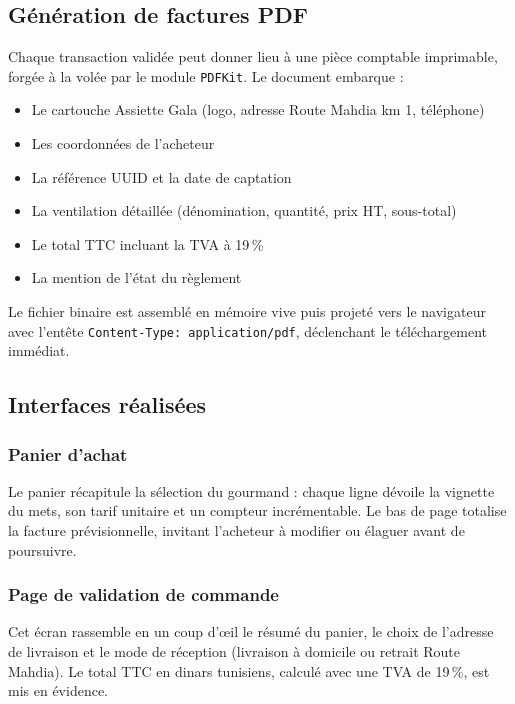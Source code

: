 \subsection{Génération de factures PDF}

Chaque transaction validée peut donner lieu à une pièce comptable imprimable, forgée à la volée par le module \texttt{PDFKit}. Le document embarque :

\begin{itemize}
    \item Le cartouche Assiette Gala (logo, adresse Route Mahdia km 1, téléphone)
    \item Les coordonnées de l'acheteur
    \item La référence UUID et la date de captation
    \item La ventilation détaillée (dénomination, quantité, prix HT, sous-total)
    \item Le total TTC incluant la TVA à 19\,\%
    \item La mention de l'état du règlement
\end{itemize}

Le fichier binaire est assemblé en mémoire vive puis projeté vers le navigateur avec l'entête \texttt{Content-Type: application/pdf}, déclenchant le téléchargement immédiat.

\subsection{Interfaces réalisées}

\subsubsection{Panier d'achat}


Le panier récapitule la sélection du gourmand : chaque ligne dévoile la vignette du mets, son tarif unitaire et un compteur incrémentable. Le bas de page totalise la facture prévisionnelle, invitant l'acheteur à modifier ou élaguer avant de poursuivre.

\subsubsection{Page de validation de commande}


Cet écran rassemble en un coup d'\oe{}il le résumé du panier, le choix de l'adresse de livraison et le mode de réception (livraison à domicile ou retrait Route Mahdia). Le total TTC en dinars tunisiens, calculé avec une TVA de 19\,\%, est mis en évidence.

